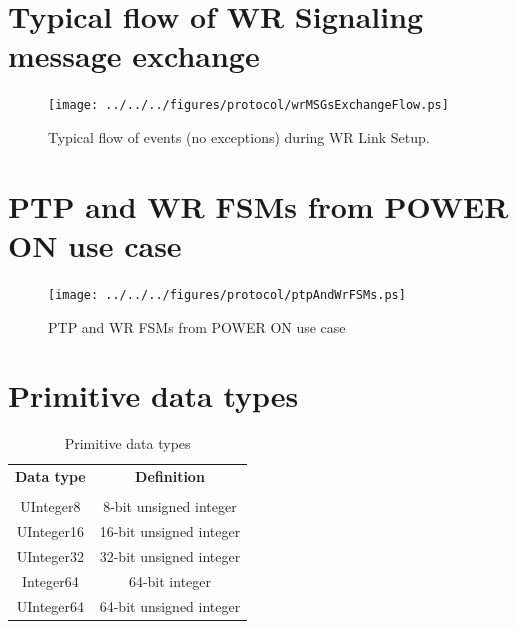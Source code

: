 \documentclass[a4paper, 12pt]{article}
\begin{document}
\newpage

\section{Typical flow of WR Signaling message exchange}
\label{ap:wr_lsu_flow}
\begin{figure}[ht!]
  \centering
  \texttt{[image: ../../../figures/protocol/wrMSGsExchangeFlow.ps]}
  \caption{Typical flow of events (no exceptions) during WR Link Setup.}
  \label{fig:wrFSMcommun}
\end{figure}

\newpage


\section{PTP and WR FSMs from POWER ON use case}
\label{ap:ptpAndWrFSMS}
\begin{figure}[ht!]
  \centering
  \texttt{[image: ../../../figures/protocol/ptpAndWrFSMs.ps]}
  \caption{PTP and WR FSMs from POWER ON use case}
  \label{fig:wrFSMcommun}
\end{figure}

\newpage


\section{Primitive data types}
\label{ap:wrDataTypes}

\begin{table}[ht!]
\caption{Primitive data types}
\centering
\begin{tabular}{| c | c |}          					\hline
\textbf{Data type  } &  \textbf{Definition}				  \\ 
		     &  	               				  \\ \hline
UInteger8	     &   8-bit unsigned integer				  \\ \hline
UInteger16	     &  16-bit unsigned integer				  \\ \hline
UInteger32	     &  32-bit unsigned integer				  \\ \hline
 Integer64	     &  64-bit integer					  \\ \hline
UInteger64	     &  64-bit unsigned integer				  \\ \hline
\end{tabular}
\label{tab:wrPtpProfile}
\end{table}
\end{document}
